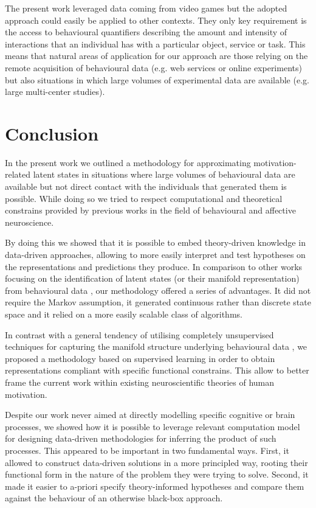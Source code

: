 The present work leveraged data coming from video games but the adopted approach could easily be applied to other contexts. They only key requirement is the access to behavioural quantifiers describing the amount and intensity of interactions that an individual has with a particular object, service or task. This means that natural areas of application for our approach are those relying on the remote acquisition of behavioural data (e.g. web services or online experiments) but also situations in which large volumes of experimental data are available (e.g. large multi-center studies). 

\section{Conclusion}
\label{conclusions}
In the present work we outlined a methodology for approximating motivation-related latent states in situations where large volumes of behavioural data are available but not direct contact with the individuals that generated them is possible. While doing so we tried to respect computational and theoretical constrains provided by previous works in the field of behavioural and affective neuroscience. 

By doing this we showed that it is possible to embed theory-driven knowledge in data-driven approaches, allowing to more easily interpret and test hypotheses on the representations and predictions they produce. In comparison to other works focusing on the identification of latent states (or their manifold representation) from behavioural data \cite{calhoun2019unsupervised, luxem2020identifying, pereira2020quantifying, shi2021learning, mccullough2021unsupervised}, our methodology offered a series of advantages. It did not require the Markov assumption, it generated continuous rather than discrete state space and it relied on a more easily scalable class of algorithms. 

In contrast with a general tendency of utilising completely unsupervised techniques for capturing the manifold structure underlying behavioural data \cite{calhoun2019unsupervised, luxem2020identifying, pereira2020quantifying, shi2021learning, mccullough2021unsupervised}, we proposed a methodology based on supervised learning in order to obtain representations compliant with specific functional constrains. This allow to better frame the current work within existing neuroscientific theories of human motivation. 

Despite our work never aimed at directly modelling specific cognitive or brain processes, we showed how it is possible to leverage relevant computation model for designing data-driven methodologies for inferring the product of such processes. This appeared to be important in two fundamental ways. First, it allowed to construct data-driven solutions in a more principled way, rooting their functional form in the nature of the problem they were trying to solve. Second, it made it easier to a-priori specify theory-informed hypotheses and compare them against the behaviour of an otherwise black-box approach.

